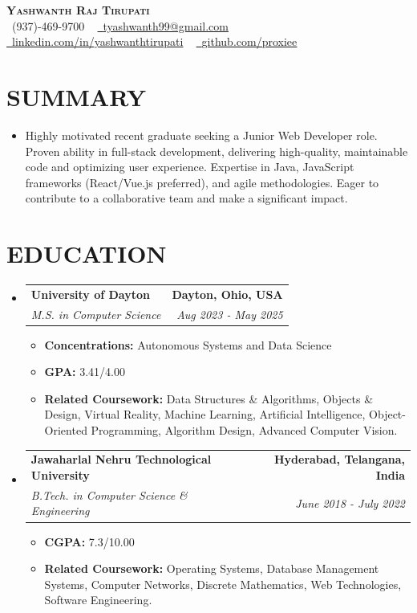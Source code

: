 \documentclass[letterpaper,11pt]{article}
\makeatletter
\newcommand{\resumeItem}[1]{\item\small{{#1 \vspace{-3pt}}}}
\newcommand{\resumeSubheading}[4]{\vspace{-2pt}\item\begin{tabular*}{0.97\textwidth}[t]{l@{\extracolsep{\fill}}r}\textbf{#1} & #2 \\\textit{\small#3} & \textit{\small #4} \\\end{tabular*}\vspace{-7pt}}
\newcommand{\resumeSubHeadingListStart}{\begin{itemize}[leftmargin=0.15in, label={}]}
\newcommand{\resumeSubHeadingListEnd}{\end{itemize}}
\newcommand{\resumeItemListStart}{\begin{itemize}}
\newcommand{\resumeItemListEnd}{\end{itemize}\vspace{-5pt}}
\makeatother
\begin{document}
\begin{center}
    \textbf{\Huge \scshape {\fontsize{15pt}{20pt}\selectfont Yashwanth Raj Tirupati}} \\ \vspace{1pt}
    \small \raisebox{-0.1\height}\faPhone\ (937)-469-9700 ~ \href{mailto:tyashwanth99@gmail.com}{\raisebox{-0.2\height}\faEnvelope\  \underline{tyashwanth99@gmail.com}} ~ 
    \href{https://linkedin.com/in/yashwanthtirupati}{\raisebox{-0.2\height}\faLinkedin\ \underline{linkedin.com/in/yashwanthtirupati}} ~ 
    \href{https://github.com/proxiee}{\raisebox{-0.2\height}\faGithub\ \underline{github.com/proxiee}}
    \vspace{-8pt}
\end{center}


\section{{\fontsize{9pt}{20pt}\selectfont \textbf{SUMMARY}}}
\resumeSubHeadingListStart

\resumeItem{Highly motivated recent graduate seeking a Junior Web Developer role. Proven ability in full-stack development,  delivering high-quality, maintainable code and optimizing user experience.  Expertise in Java, JavaScript frameworks (React/Vue.js preferred), and agile methodologies. Eager to contribute to a collaborative team and make a significant impact.}
\resumeSubHeadingListEnd
\vspace{-18pt}

\section{{\fontsize{9pt}{20pt}\selectfont \textbf{EDUCATION}}}
\resumeSubHeadingListStart
\resumeSubheading{University of Dayton}{\textbf{Dayton, Ohio, USA}}{M.S. in Computer Science}{Aug 2023 - May 2025}
\resumeItemListStart
\resumeItem{\textbf{Concentrations:} Autonomous Systems and Data Science}
\resumeItem{\textbf{GPA:} 3.41/4.00}
\resumeItem{\textbf{Related Coursework:} Data Structures \& Algorithms, Objects \& Design, Virtual Reality, Machine Learning, Artificial Intelligence, Object-Oriented Programming, Algorithm Design, Advanced Computer Vision.}
\resumeItemListEnd
\resumeSubheading{Jawaharlal Nehru Technological University}{\textbf{Hyderabad, Telangana, India}}{B.Tech. in Computer Science \& Engineering}{June 2018 - July 2022}
\resumeItemListStart
\resumeItem{\textbf{CGPA:} 7.3/10.00}
\resumeItem{\textbf{Related Coursework:} Operating Systems, Database Management Systems, Computer Networks, Discrete Mathematics, Web Technologies, Software Engineering.}
\resumeItemListEnd
\resumeSubHeadingListEnd
\vspace{-18pt}
\end{document}
